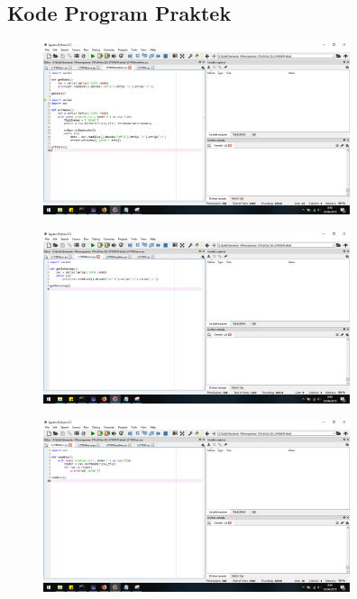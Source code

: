 \subsection{Kode Program Praktek}
\begin{figure}[H]
	\includegraphics[width=9cm]{figures/5/1174031/Praktek/realtime.png}
	\centering
\end{figure}

\begin{figure}[H]
	\includegraphics[width=9cm]{figures/5/1174031/Praktek/save.png}
	\centering
\end{figure}

\begin{figure}[H]
	\includegraphics[width=9cm]{figures/5/1174031/Praktek/csv.png}
	\centering
\end{figure}

